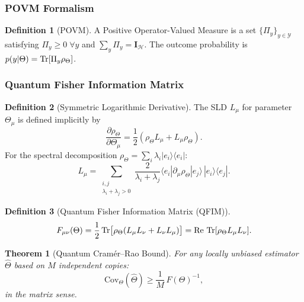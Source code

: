 \documentclass[12pt,a4paper]{article}
\theoremstyle{definition}
\newtheorem{definition}{Definition}[section]
\theoremstyle{plain}
\newtheorem{theorem}{Theorem}[section]
\begin{document}
\subsubsection{POVM Formalism}

\begin{definition}[POVM]
A Positive Operator-Valued Measure is a set $\{\Pi_y\}_{y\in\mathcal{Y}}$ satisfying
$\Pi_y\ge0\;\forall y$ and $\sum_y\Pi_y=\mathbf{I}_\mathcal{H}$. The outcome probability is
$p(y|\Theta)=\Tr[\Pi_y\rho_\Theta]$.
\end{definition}

\subsubsection{Quantum Fisher Information Matrix}

\begin{definition}[Symmetric Logarithmic Derivative]
The SLD $L_\mu$ for parameter $\Theta_\mu$ is defined implicitly by
\begin{equation}
\frac{\partial\rho_\Theta}{\partial\Theta_\mu}=\frac{1}{2}(\rho_\Theta L_\mu+L_\mu\rho_\Theta).
\end{equation}
For the spectral decomposition $\rho_\Theta=\sum_i\lambda_i|e_i\rangle\langle e_i|$:
\begin{equation}
L_\mu=\sum_{\substack{i,j\\\lambda_i+\lambda_j>0}}\frac{2}{\lambda_i+\lambda_j}
\langle e_i|\partial_\mu\rho_\Theta|e_j\rangle\,|e_i\rangle\langle e_j|.
\label{eq:SLD}
\end{equation}
\end{definition}

\begin{definition}[Quantum Fisher Information Matrix (QFIM)]
\begin{equation}
F_{\mu\nu}(\Theta)=\frac{1}{2}\Tr\bigl[\rho_\Theta(L_\mu L_\nu+L_\nu L_\mu)\bigr]
=\mathrm{Re}\,\Tr[\rho_\Theta L_\mu L_\nu].
\label{eq:QFIM}
\end{equation}
\end{definition}

\begin{theorem}[Quantum Cram\'er--Rao Bound]
For any locally unbiased estimator $\hat\Theta$ based on $M$ independent copies:
\begin{equation}
\mathrm{Cov}_\Theta(\hat\Theta)\ge\frac{1}{M}\,F(\Theta)^{-1},
\label{eq:QCRB}
\end{equation}
in the matrix sense.
\end{theorem}
\end{document}

